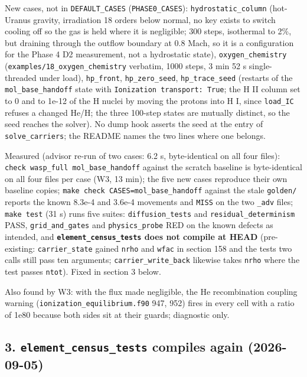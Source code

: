 \documentclass[english,a4paper]{my_memo}
\begin{document}
New cases, not in \texttt{DEFAULT\_CASES} (\texttt{PHASE0\_CASES}): \texttt{hydrostatic\_column}
(hot-Uranus gravity, irradiation 18 orders below normal, no key exists to
switch cooling off so the gas is held where it is negligible; 300 steps,
isothermal to 2\%, but draining through the outflow boundary at 0.8 Mach,
so it is a configuration for the Phase 4 D2 measurement, not a hydrostatic
state), \texttt{oxygen\_chemistry} (\texttt{examples/18\_oxygen\_chemistry} verbatim, 1000
steps, 3 min 52 s single-threaded under load), \texttt{hp\_front}, \texttt{hp\_zero\_seed},
\texttt{hp\_trace\_seed} (restarts of the \texttt{mol\_base\_handoff} state with \texttt{Ionization\ transport:\ True}; the H II column set to 0 and to 1e-12 of the H nuclei by
moving the protons into H I, since \texttt{load\_IC} refuses a changed He/H; the
three 100-step states are mutually distinct, so the seed reaches the
solver). No dump hook asserts the seed at the entry of \texttt{solve\_carriers};
the README names the two lines where one belongs.

Measured (advisor re-run of two cases: 6.2 s, byte-identical on all four
files): \texttt{check\ wasp\_full\ mol\_base\_handoff} against the scratch baseline is
byte-identical on all four files per case (W3, 13 min); the five new cases
reproduce their own baseline copies; \texttt{make\ check\ CASES=mol\_base\_handoff}
against the stale \texttt{golden/} reports the known 8.3e-4 and 3.6e-4 movements
and \texttt{MISS} on the two \texttt{\_adv} files; \texttt{make\ test} (31 s) runs five suites:
\texttt{diffusion\_tests} and \texttt{residual\_determinism} PASS, \texttt{grid\_and\_gates} and
\texttt{physics\_probe} RED on the known defects as intended, and
\textbf{\texttt{element\_census\_tests} does not compile at HEAD} (pre-existing:
\texttt{carrier\_state} gained \texttt{nrho} and \texttt{wfac} in section 158 and the test\textquotesingle s two
calls still pass ten arguments; \texttt{carrier\_write\_back} likewise takes \texttt{nrho}
where the test passes \texttt{ntot}). Fixed in section 3 below.

Also found by W3: with the flux made negligible, the He recombination
coupling warning (\texttt{ionization\_equilibrium.f90} 947, 952) fires in every
cell with a ratio of 1e80 because both sides sit at their guards; diagnostic
only.

\subsection{\texorpdfstring{3. \texttt{element\_census\_tests} compiles again (2026-09-05)}{3. element\_census\_tests compiles again (2026-09-05)}}\label{3-element_census_tests-compiles-again-2026-09-05}
\end{document}
